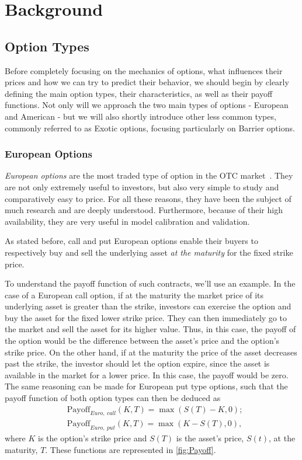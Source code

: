 \chapter{Background}
\label{chapter:background}
\section{Option Types}
Before completely focusing on the mechanics of options, what influences their prices and how we can try to predict their behavior, we should begin by clearly defining the main option types, their characteristics, as well as their payoff functions. Not only will we approach the two main types of options - European and American - but we will also shortly introduce other less common types, commonly referred to as Exotic options, focusing particularly on Barrier options.



\subsection{European Options}
\emph{European options} are the most traded type of option in the OTC market~\citep{InvEuro}. They are not only extremely useful to investors, but also very simple to study and comparatively easy to price. For all these reasons, they have been the subject of much research and are deeply understood. Furthermore, because of their high availability, they are very useful in model calibration and validation.


As stated before, call and put European options enable their buyers to respectively buy and sell the underlying asset \emph{at the maturity} for the fixed strike price.

To understand the payoff function of such contracts, we'll use an example. In the case of a European call option, if at the maturity the market price of its underlying asset is greater than the strike, investors can exercise the option and buy the asset for the fixed lower strike price. They can then immediately go to the market and sell the asset for its higher value. Thus, in this case, the payoff of the option would be the difference between the asset's price and the option's strike price. On the other hand, if at the maturity the price of the asset decreases past the strike, the investor should let the option expire, since the asset is available in the market for a lower price. In this case, the payoff would be zero.
The same reasoning can be made for European put type options, such that the payoff function of both option types can then be deduced as
\begin{subequations}\label{callput}
\begin{align}
&\text{Payoff}_{Euro,\ call}(K,T)=\max\left(S(T)-K,0\right);\\
&\text{Payoff}_{Euro,\ put}(K,T)=\max\left(K-S(T),0\right),
\end{align}
\end{subequations}
\noindent where $K$ is the option's strike price and $S(T)$ is the asset's price, $S(t)$, at the maturity, $T$. These functions are represented in \autoref{fig:Payoff}.

